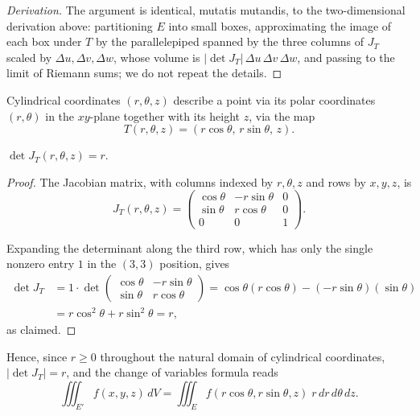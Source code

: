 \begin{proof}[Derivation]
The argument is identical, mutatis mutandis, to the two-dimensional derivation above: partitioning $E$ into small boxes, approximating the image of each box under $T$ by the parallelepiped spanned by the three columns of $J_T$ scaled by $\Delta u, \Delta v, \Delta w$, whose volume is $|\det J_T|\,\Delta u\,\Delta v\,\Delta w$, and passing to the limit of Riemann sums; we do not repeat the details.
\end{proof}

Cylindrical coordinates $(r,\theta,z)$ describe a point via its polar coordinates $(r,\theta)$ in the $xy$-plane together with its height $z$, via the map
\[
T(r,\theta,z) = (r\cos\theta, \, r\sin\theta, \, z).
\]

\begin{proposition}
$\det J_T(r,\theta,z) = r$.
\end{proposition}

\begin{proof}
The Jacobian matrix, with columns indexed by $r,\theta,z$ and rows by $x,y,z$, is
\[
J_T(r,\theta,z) = \begin{pmatrix} \cos\theta & -r\sin\theta & 0 \\ \sin\theta & r\cos\theta & 0 \\ 0 & 0 & 1 \end{pmatrix}.
\]

Expanding the determinant along the third row, which has only the single nonzero entry $1$ in the $(3,3)$ position, gives
\begin{align*}
\det J_T &= 1 \cdot \det \begin{pmatrix} \cos\theta & -r\sin\theta \\ \sin\theta & r\cos\theta \end{pmatrix} = \cos\theta(r\cos\theta) - (-r\sin\theta)(\sin\theta) \\
&= r\cos^2\theta + r\sin^2\theta = r,
\end{align*}
as claimed.
\end{proof}

Hence, since $r \geq 0$ throughout the natural domain of cylindrical coordinates, $|\det J_T| = r$, and the change of variables formula reads
\[
\iiint_{E'} f(x,y,z)\, dV = \iiint_E f(r\cos\theta, r\sin\theta, z) \; r\, dr\, d\theta\, dz.
\]

